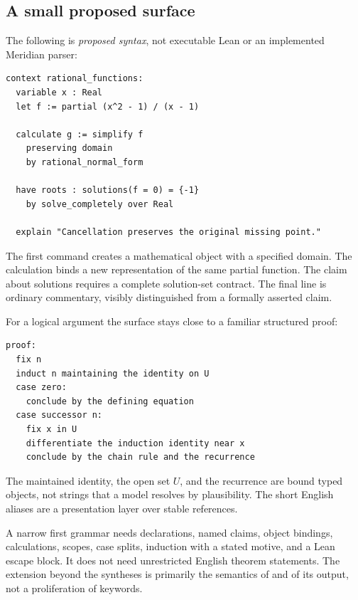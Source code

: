 \documentclass[11pt,a4paper]{article}
\newcommand{\code}[1]{\texttt{\detokenize{#1}}}
\theoremstyle{remark}
\begin{document}
\subsection{A small proposed surface}
The following is \emph{proposed syntax}, not executable Lean or an implemented
Meridian parser:
\par\smallskip\noindent\begin{minipage}{\linewidth}
\begin{lstlisting}
context rational_functions:
  variable x : Real
  let f := partial (x^2 - 1) / (x - 1)

  calculate g := simplify f
    preserving domain
    by rational_normal_form

  have roots : solutions(f = 0) = {-1}
    by solve_completely over Real

  explain "Cancellation preserves the original missing point."
\end{lstlisting}
\end{minipage}\par\smallskip
The first command creates a mathematical object with a specified domain. The
calculation binds a new representation of the same partial function. The claim
about solutions requires a complete solution-set contract. The final line is
ordinary commentary, visibly distinguished from a formally asserted claim.

For a logical argument the surface stays close to a familiar structured proof:
\par\smallskip\noindent\begin{minipage}{\linewidth}
\begin{lstlisting}
proof:
  fix n
  induct n maintaining the identity on U
  case zero:
    conclude by the defining equation
  case successor n:
    fix x in U
    differentiate the induction identity near x
    conclude by the chain rule and the recurrence
\end{lstlisting}
\end{minipage}\par\smallskip
The maintained identity, the open set $U$, and the recurrence are bound typed
objects, not strings that a model resolves by plausibility. The short English
aliases are a presentation layer over stable references.

A narrow first grammar needs declarations, named claims, object bindings,
calculations, scopes, case splits, induction with a stated motive, and a Lean
escape block. It does not need unrestricted English theorem statements. The
extension beyond the syntheses is primarily the semantics of \code{calculate}
and of its output, not a proliferation of keywords.
\end{document}
